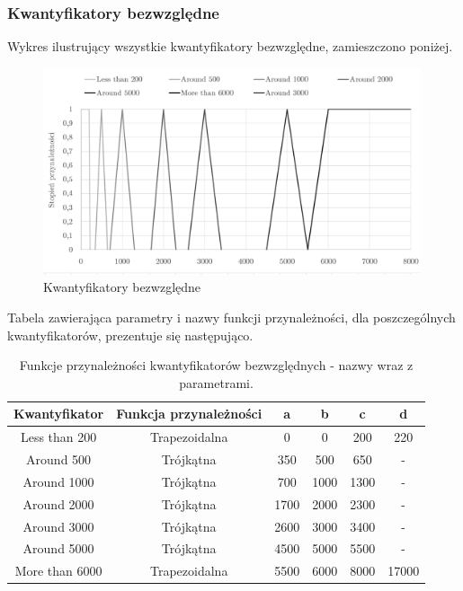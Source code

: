 \documentclass{classrep}
\begin{document}
\subsubsection{Kwantyfikatory bezwzględne}
Wykres ilustrujący wszystkie kwantyfikatory bezwzględne, zamieszczono poniżej.
\begin{figure}[H]
	\centering
	\includegraphics[width=0.99\textwidth]{Pictures/TermsCharts/absolute.png}
	\caption{Kwantyfikatory bezwzględne}
\end{figure}

Tabela zawierająca parametry i nazwy funkcji przynależności, dla poszczególnych kwantyfikatorów, prezentuje się następująco.
\begin{table}[H]
	\centering
	\begin{tabular}{c c c c c c} 
		\hline
		\textbf{Kwantyfikator} & \textbf{Funkcja przynależności} & \textbf{a} & \textbf{b} & \textbf{c} & \textbf{d}\\ [0.5ex] 
		\hline
		\hline 
Less than 200	 	& Trapezoidalna 		& 0 & 0 & 200 & 220 \\
Around 500			& Trójkątna  			& 350 & 500 & 650 & - \\
Around 1000		      & Trójkątna   			& 700 & 1000 & 1300 & - \\
Around 2000	 		& Trójkątna 			& 1700 & 2000 & 2300 & - \\
Around 3000 		 	& Trójkątna 			& 2600 & 3000 & 3400 & - \\
Around 5000	 		& Trójkątna 			& 4500 & 5000 & 5500 & - \\
More than 6000		& Trapezoidalna 		& 5500 & 6000 & 8000 & 17000 \\
		\hline
	\end{tabular}
	\caption{Funkcje przynależności kwantyfikatorów bezwzględnych - nazwy wraz z parametrami.}
\end{table}
\end{document}
